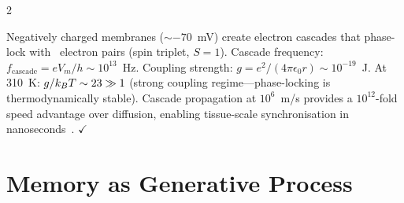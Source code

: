 \begin{multicols}{2}
\begin{corollary}
\label{cor:membrane_phase_lock}
Negatively charged membranes (${\sim}{-}70$~mV) create electron cascades that
phase-lock with \Otwo\ electron pairs (spin triplet, $S=1$).  Cascade
frequency: $f_{\text{cascade}} = eV_m/h \sim 10^{13}$~Hz.  Coupling strength:
$g = e^2/(4\pi\epsilon_0 r) \sim 10^{-19}$~J.  At 310~K:
$g/k_B T \sim 23 \gg 1$ (strong coupling regime---phase-locking is
thermodynamically stable).  Cascade propagation at $10^6$~m/s provides a
$10^{12}$-fold speed advantage over diffusion, enabling tissue-scale
synchronisation in nanoseconds~\citep{leone2017ultrafast}. $\checkmark$
\end{corollary}

\end{multicols}

\section{Memory as Generative Process}
\label{sec:cc_memory}

